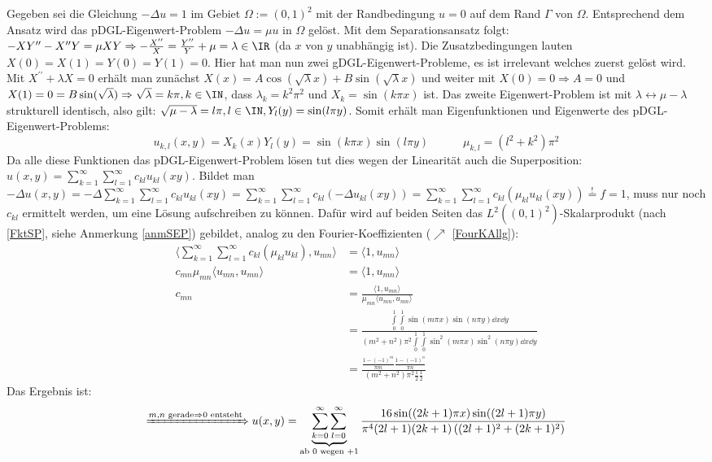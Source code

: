     	{\color{gray} Gegeben sei die Gleichung $-\Delta u=1$ im Gebiet $\Omega:=(0,1)^2$ mit der Randbedingung $u=0$ auf dem Rand $\Gamma$ von $\Omega$. Entsprechend dem Ansatz wird das pDGL-Eigenwert-Problem $-\Delta u=\mu u$ in $\Omega$ gelöst. Mit dem Separationsansatz folgt: $-XY^{\prime\prime}-X^{\prime\prime}Y=\mu XY\Rightarrow - \frac{X^{\prime\prime}}{X}=\frac{Y^{\prime\prime}}{Y}+\mu=\lambda\in\IR$ (da $x$ von $y$ unabhängig ist). Die Zusatzbedingungen lauten $X(0)=X(1)=Y(0)=Y(1)=0$. Hier hat man nun zwei gDGL-Eigenwert-Probleme, es ist irrelevant welches zuerst gelöst wird. Mit $X^{\prime\prime}+\lambda X=0$ erhält man zunächst $X(x)=A\cos(\sqrt{\lambda}x)+B\sin(\sqrt{\lambda}x)$ und weiter mit $X(0)=0\Rightarrow A=0$ und $X(1)=0=B\sin(\sqrt{\lambda})\Rightarrow \sqrt{\lambda}=k\pi, k\in \IN$, dass $\lambda_k=k^2\pi^2$ und $X_k=\sin(k\pi x)$ ist. Das zweite Eigenwert-Problem ist mit $\lambda\leftrightarrow \mu -\lambda$ strukturell identisch, also gilt: $\sqrt{\mu-\lambda}=l\pi,l\in\IN,Y_l(y)=\sin(l\pi y)$. Somit erhält man Eigenfunktionen und Eigenwerte des pDGL-Eigenwert-Problems:
    	$$
    	u_{k,l}(x,y)=X_k(x)Y_l(y)=\sin(k\pi x)\sin(l\pi y)\quad\quad\quad \mu_{k,l}=(l^2+k^2)\pi^2$$ 
    	Da alle diese Funktionen das pDGL-Eigenwert-Problem lösen tut dies wegen der Linearität auch die Superposition: $u(x,y)=\sum\limits_{k=1}^\infty\sum\limits_{l=1}^\infty c_{kl}u_{kl}(xy)$. Bildet man $-\Delta u(x,y)=-\Delta\sum\limits_{k=1}^\infty\sum\limits_{l=1}^\infty c_{kl}u_{kl}(xy)=\sum\limits_{k=1}^\infty\sum\limits_{l=1}^\infty c_{kl}(-\Delta u_{kl}(xy))=\sum\limits_{k=1}^\infty\sum\limits_{l=1}^\infty c_{kl}(\mu_{kl} u_{kl}(xy))\stackrel{!}{=}f=1$, muss nur noch $c_{kl}$ ermittelt werden, um eine Lösung aufschreiben zu können. Dafür wird auf beiden Seiten das $L^2((0,1)^2)$-Skalarprodukt (nach \ref{FktSP}, siehe Anmerkung \ref{anmSEP}) gebildet, analog zu den Fourier-Koeffizienten ($\nearrow$ \ref{FourKAllg}):
    	\begin{equation*}
    		\begin{split}
    			\langle\sum\limits_{k=1}^\infty\sum\limits_{l=1}^\infty c_{kl}(\mu_{kl} u_{kl}),u_{mn}\rangle &= \langle1,u_{mn}\rangle\\
    			c_{mn}\mu_{mn} \langle u_{mn}, u_{mn} \rangle &= \langle1,u_{mn}\rangle\\
    			c_{mn}&=\frac{\langle1,u_{mn}\rangle}{\mu_{mn} \langle u_{mn}, u_{mn}\rangle}\\
    			&=\frac{\int\limits_0^1\int\limits_0^1 \sin(m\pi x) \sin(n\pi y)\dd x \dd y}{(m^2+n^2)\pi^2\int\limits_0^1\int\limits_0^1 \sin^2(m\pi x) \sin^2(n\pi y) \dd x \dd y}\\
    			&=\frac{\frac{1-(-1)^m}{\pi m}\frac{1-(-1)^n}{\pi n}}{(m^2+n^2)\pi^2\frac{1}{2}\frac{1}{2}}
    		\end{split}
    		\end{equation*}
    	Das Ergebnis ist:
    	\begin{equation*}
    		\xRightarrow{m,n\text{ gerade}\Rightarrow 0 \text{ entsteht}} u(x,y)=\underbrace{\sum\limits_{k=0}^\infty\sum\limits_{l=0}^\infty}_{\text{ab 0 wegen } +1} \frac{16\sin((2k+1)\pi x)\sin((2l+1)\pi y)}{\pi^4(2l+1)(2k+1)\left((2l+1)^2+(2k+1)^2\right)} 
    		\end{equation*}}
